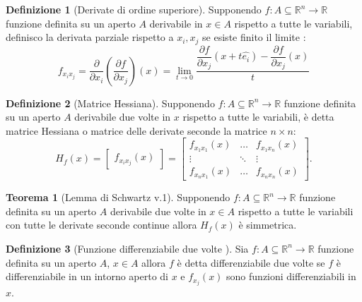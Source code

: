 \documentclass[leqno]{article}
\theoremstyle{definition}
\newtheorem{definition}{Definizione}[section]
\numberwithin{equation}{section}
\newtheorem{theorem}{Teorema}[section]
\theoremstyle{remark}
\begin{document}
	\begin{definition}[Derivate di ordine superiore]
		Supponendo $f:A\subseteq \mathbb{R}^n \rightarrow \mathbb{R}$ funzione definita su un aperto $A$ derivabile in $x\in A$ rispetto a tutte le variabili, definisco la derivata parziale rispetto a $x_i,x_j$ se esiste finito il limite :
		\begin{equation}
			f_{x_ix_j}=\frac{\partial 
			}{\partial x_i}\left({\frac {\partial f}{\partial x_{j}}}\right)(x)=\lim _{t\to 0}{\frac {\dfrac {\partial f}{\partial x_{j}}(  {x} +t  \hat{e_{i}})-\dfrac {\partial f}{\partial x_{j}}(  {x} )}{t}}
		\end{equation}
	\end{definition}
	
	\begin{definition}[Matrice Hessiana]
		Supponendo $f:A\subseteq \mathbb{R}^n \rightarrow \mathbb{R}$ funzione definita su un aperto $A$ derivabile due volte in $x$ rispetto a tutte le variabili, è detta matrice Hessiana o matrice delle derivate seconde la matrice $n \times n$:
		\begin{equation}
			H_f(x)=\begin{bmatrix}
				f_{x_ix_j}(x)
			\end{bmatrix}=\begin{bmatrix}
				f_{x_1x_1}(x) & \dots & f_{x_1x_n}(x)\\
				\vdots & \ddots & \vdots \\
				f_{x_nx_1}(x) & \dots & f_{x_nx_n}(x)
			\end{bmatrix}.
		\end{equation}
	\end{definition}
	
	\begin{theorem}[Lemma di Schwartz v.1]
		Supponendo $f:A\subseteq \mathbb{R}^n \rightarrow \mathbb{R}$ funzione definita su un aperto $A$ derivabile due volte in $x\in A$ rispetto a tutte le variabili con tutte le derivate seconde continue allora $H_f(x)$ è simmetrica.
	\end{theorem}
	
	\begin{definition}[Funzione differenziabile due volte ]
		Sia $f:A\subseteq \mathbb{R}^n \rightarrow \mathbb{R}$ funzione definita su un aperto $A$, $x\in A$ allora $f$ è detta differenziabile due volte se $f$ è differenziabile in un intorno aperto di $x$ e $f_{x_j}(x)$ sono funzioni differenziabili in $x$.
	\end{definition}
	
\end{document}
